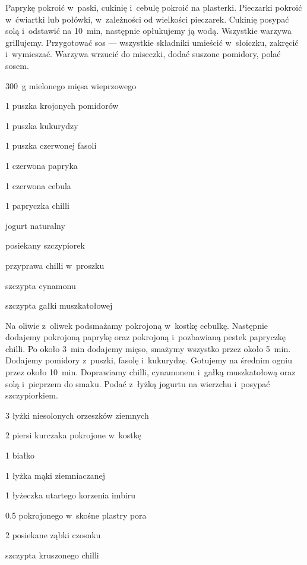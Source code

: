 \documentclass[../main.tex]{subfiles}
\begin{document}
Paprykę pokroić w~paski, cukinię i~cebulę pokroić na plasterki. Pieczarki
pokroić w~ćwiartki lub połówki, w~zależności od wielkości pieczarek. Cukinię
posypać solą i~odstawić na \qty{10}{\minute}, następnie opłukujemy ją wodą.
Wszystkie warzywa grillujemy. Przygotować sos — wszystkie składniki umieścić
w~słoiczku, zakręcić i~wymieszać. Warzywa wrzucić do miseczki, dodać suszone
pomidory, polać sosem.


\begin{Ingred}
    \item \qty{300}{\gram} mielonego mięsa wieprzowego
    \item \num{1} puszka krojonych pomidorów
    \item \num{1} puszka kukurydzy
    \item \num{1} puszka czerwonej fasoli
    \item \num{1} czerwona papryka
    \item \num{1} czerwona cebula
    \item \num{1} papryczka chilli
    \item jogurt naturalny
    \item posiekany szczypiorek
    \item przyprawa chilli w~proszku
    \item szczypta cynamonu
    \item szczypta gałki muszkatołowej
\end{Ingred}

Na oliwie z~oliwek podsmażamy pokrojoną w~kostkę cebulkę. Następnie dodajemy
pokrojoną paprykę oraz pokrojoną i~pozbawianą pestek papryczkę chilli. Po około
\qty{3}{\minute} dodajemy mięso, smażymy wszystko przez około \qty{5}{\minute}.
Dodajemy pomidory z~puszki, fasolę i~kukurydzę. Gotujemy na średnim ogniu przez
około \qty{10}{\minute}. Doprawiamy chilli, cynamonem i~gałką muszkatołową oraz
solą i~pieprzem do smaku. Podać z~łyżką jogurtu na wierzchu i~posypać
szczypiorkiem.


\begin{Ingred}
    \item \num{3} łyżki niesolonych orzeszków ziemnych
    \item \num{2} piersi kurczaka pokrojone w~kostkę
\end{Ingred}

\begin{Ingred}[marynata]
    \item \num{1} białko
    \item \num{1} łyżka mąki ziemniaczanej
    \item \num{1} łyżeczka utartego korzenia imbiru
    \item \num{0.5} pokrojonego w~skośne plastry pora
    \item \num{2} posiekane ząbki czosnku
    \item szczypta kruszonego chilli
\end{Ingred}
\end{document}
